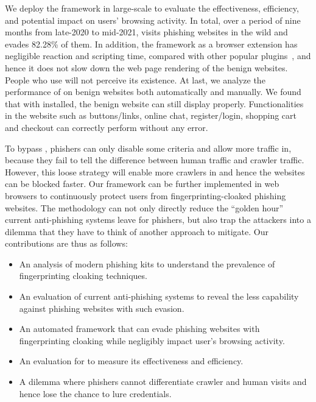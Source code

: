 We deploy the \spartacus framework in large-scale to evaluate the effectiveness, efficiency, and potential impact on users' browsing activity.
In total, over a period of nine months from late-2020 to mid-2021, \spartacus visits \totalphishing phishing websites in the wild and evades 82.28\% of them.
In addition, the \spartacus framework as a browser extension has negligible reaction and scripting time, compared with other popular plugins~\cite{exthouse}, and hence it does not slow down the web page rendering of the benign websites.
People who use \spartacus will not perceive its existence.
At last, we analyze the performance of \spartacus on benign websites both automatically and manually.
We found that with \spartacus installed, the benign website can still display properly.
Functionalities in the website such as buttons/links, online chat, register/login, shopping cart and checkout can correctly perform without any error.

To bypass \spartacus, phishers can only disable some criteria and allow more traffic in, because they fail to tell the difference between human traffic and crawler traffic.
However, this loose strategy will enable more crawlers in and hence the websites can be blocked faster.
Our \spartacus framework can be further implemented in web browsers to continuously protect users from fingerprinting-cloaked phishing websites.
The methodology can not only directly reduce the ``golden hour'' current anti-phishing systems leave for phishers,
but also trap the attackers into a dilemma that they have to think of another approach to mitigate.
Our contributions are thus as follows:

\begin{itemize}
    \item An analysis of modern phishing kits to understand the prevalence of fingerprinting cloaking techniques.
    \item An evaluation of current anti-phishing systems to reveal the less capability against phishing websites with such evasion.
    \item An automated framework that can evade phishing websites with fingerprinting cloaking while negligibly impact user's browsing activity.
    \item An evaluation for \spartacus to measure its effectiveness and efficiency.
    \item A dilemma where phishers cannot differentiate crawler and human visits and hence lose the chance to lure credentials.
\end{itemize}
